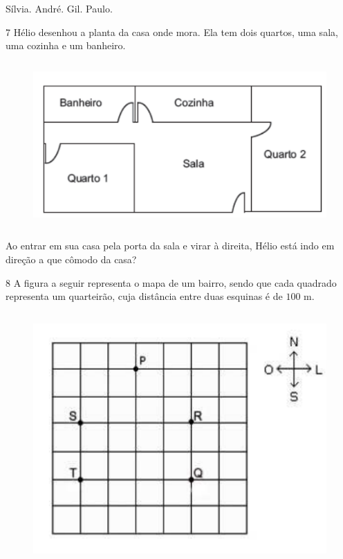 {{{{\begin{boxlist}
 Sílvia.
 André.
 Gil.
 Paulo.
\end{boxlist}




\num{7}  Hélio desenhou a planta da casa onde mora. Ela tem dois quartos, uma
sala, uma cozinha e um banheiro.

\begin{figure}[H]
\centering\includegraphics[width=4.94792in,height=2.46875in]{./imgSAEB_6_MAT/media/image71.png}
\end{figure}

Ao entrar em sua casa pela porta da sala e virar à direita, Hélio está
indo em direção a que cômodo da casa?


\num{8}  A figura a seguir representa o mapa de um bairro, sendo que cada
quadrado representa um quarteirão, cuja distância entre duas esquinas é
de $100$ m.

\begin{figure}[H]
\centering\includegraphics[width=4.82569in,height=3.77917in]{./imgSAEB_6_MAT/media/image72.png}
\end{figure}

}}}}
